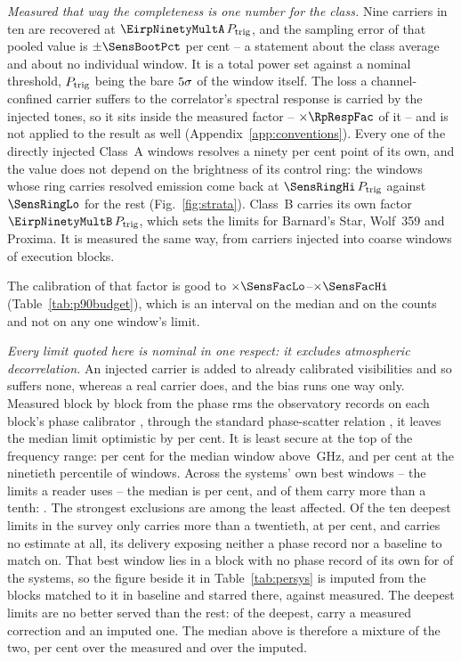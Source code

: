 \emph{Measured that way the completeness is one number for the class.} Nine
carriers in ten are recovered at $\EirpNinetyMultA\,P_{\rm trig}$, and the
sampling error of that pooled value is $\pm\SensBootPct$ per cent -- a
statement about the class average and about no individual window. It is a
total power set against a nominal threshold, $P_{\rm trig}$ being the bare
$5\sigma$ of the window itself. The loss a channel-confined
carrier suffers to the correlator's spectral response is carried by the
injected tones, so it sits inside the measured factor -- $\times\RpRespFac$
of it -- and is not applied to the result as well
(Appendix~\ref{app:conventions}). Every one of the \SensNInj{} directly
injected Class~A windows resolves a ninety per cent point of its own, and the
value does not depend on the brightness of its control ring: the
\SensNRingHi{} windows whose ring carries resolved emission come back at
$\SensRingHi\,P_{\rm trig}$ against $\SensRingLo$ for the rest
(Fig.~\ref{fig:strata}). Class~B carries its own factor $\EirpNinetyMultB\,P_{\rm trig}$, which
sets the limits for Barnard's Star, Wolf~359 and Proxima. It is measured the
same way, from \SensNToneCoarse{} carriers injected into \SensNInjCoarse{}
coarse windows of \SensNInjCoarseBlock{} execution blocks.

The calibration of that factor is good to
$\times\SensFacLo$--$\times\SensFacHi$ (Table~\ref{tab:p90budget}), which is
an interval on the median and on the counts and not on any one window's
limit.

\emph{Every limit quoted here is nominal in one respect: it excludes
atmospheric decorrelation.} An injected carrier is added to already
calibrated visibilities and so suffers none, whereas a real carrier does, and
the bias runs one way only. Measured block by block from the phase rms the
observatory records on each block's phase calibrator
\citep[\S\S10.4.11, 11.3.1]{ALMAHandbook}, through the standard phase-scatter
relation \citep[Eq.~3]{Richards2022}, it leaves the median limit optimistic
by \SensDecorPct{} per cent. It is least secure at the top of the frequency
range: \SensDecorHiPct{} per cent for the median window above
\SensDecorHiGHz\,GHz, and \NmDecHiPct{} per cent at the ninetieth percentile
of windows. Across the systems' own best windows -- the limits a reader uses
-- the median is \NmDecSysMedPct{} per cent, and \NmDecNBigSys{} of them
carry more than a tenth: \NmDecBigSys. The strongest exclusions are among the
least affected. Of the ten deepest limits in the survey only
\NmDecDeepBigSys{} carries more than a twentieth, at \NmDecDeepBigPct{} per
cent, and \NmDecNoRecSys{} carries no estimate at all, its delivery exposing
neither a phase record nor a baseline to match on.
That best window lies in a block with no phase record of its own for
\NgNDecImpSys{} of the \NSysClassA{} systems, so the figure beside it in
Table~\ref{tab:persys} is imputed from the blocks matched to it in baseline
and starred there, against \NgNDecMeasSys{} measured. The deepest limits are
no better served than the rest: of the \NgNDeep{} deepest, \NgNDeepMeas{}
carry a measured correction and \NgNDeepImp{} an imputed one. The median
above is therefore a mixture of the two, \NgDecMeasMedPct{} per cent over the
measured and \NgDecImpMedPct{} over the imputed.

